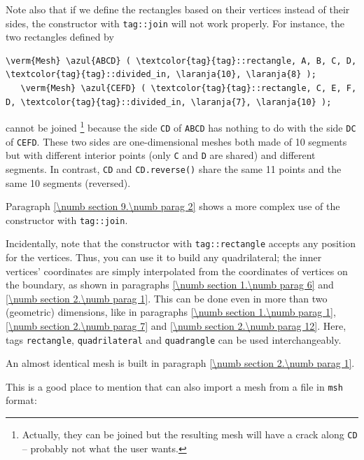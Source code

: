Note also that if we define the rectangles based on their vertices instead of their sides, 
the {\small\tt{}} constructor with {\small\tt \textcolor{tag}{tag}::join} will
not work properly. 
For instance, the two rectangles defined by

\begin{Verbatim}[commandchars=\\\{\},formatcom=\small\tt,baselinestretch=0.94]
   \verm{Mesh} \azul{ABCD} ( \textcolor{tag}{tag}::rectangle, A, B, C, D, \textcolor{tag}{tag}::divided_in, \laranja{10}, \laranja{8} );
   \verm{Mesh} \azul{CEFD} ( \textcolor{tag}{tag}::rectangle, C, E, F, D, \textcolor{tag}{tag}::divided_in, \laranja{7}, \laranja{10} );
\end{Verbatim}

\noindent cannot be joined%
\footnote {Actually, they can be joined but the resulting mesh will have
a crack along {\small\tt CD} -- probably not what the user wants.}
because the side {\small\tt CD} of {\small\tt ABCD} has nothing to do with the side 
{\small\tt DC} of {\small\tt CEFD}.
These two sides are one-dimensional meshes both made of 10 segments but with different
interior points (only {\small\tt C} and {\small\tt D} are shared) and different segments.
In contrast, {\small\tt CD} and {\small\tt CD.reverse()} share the same 11 points and
the same 10 segments (reversed).

Paragraph \ref{\numb section 9.\numb parag 2} shows a more complex use of the
{\small\tt {}} constructor with {\small\tt \textcolor{tag}{tag}::join}.

Incidentally, note that the {\small\tt {}} constructor with
{\small\tt \textcolor{tag}{tag}::rectangle} accepts any position for the vertices. 
Thus, you can use it to build any quadrilateral; the inner vertices' coordinates are simply
interpolated from the coordinates of vertices on the boundary, as shown in paragraphs
\ref{\numb section 1.\numb parag 6} and \ref{\numb section 2.\numb parag 1}.
This can be done even in more than two (geometric) dimensions, like in
paragraphs \ref{\numb section 1.\numb parag 1}, \ref{\numb section 2.\numb parag 7} and
\ref{\numb section 2.\numb parag 12}.
Here, tags {\small\tt rectangle}, {\small\tt quadrilateral} and {\small\tt quadrangle}
can be used interchangeably.

An almost identical mesh is built in paragraph \ref{\numb section 2.\numb parag 1}.

This is a good place to mention that {\maniFEM} can also import a mesh from a file
in {\small\tt msh} format:


